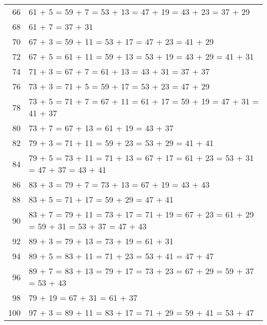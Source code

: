 \documentclass[12pt]{article}
\begin{document}
\begin{tabular}{|r|l|}
66 & 61 + 5 = 59 + 7 = 53 + 13 = 47 + 19 = 43 + 23 = 37 + 29 \\
68 & 61 + 7 = 37 + 31 \\
70 & 67 + 3 = 59 + 11 = 53 + 17 = 47 + 23 = 41 + 29 \\
72 & 67 + 5 = 61 + 11 = 59 + 13 = 53 + 19 = 43 + 29 = 41 + 31 \\
74 & 71 + 3 = 67 + 7 = 61 + 13 = 43 + 31 = 37 + 37 \\
76 & 73 + 3 = 71 + 5 = 59 + 17 = 53 + 23 = 47 + 29 \\
78 & 73 + 5 = 71 + 7 = 67 + 11 = 61 + 17 = 59 + 19 = 47 + 31 = 41 + 37 \\
80 & 73 + 7 = 67 + 13 = 61 + 19 = 43 + 37 \\
82 & 79 + 3 = 71 + 11 = 59 + 23 = 53 + 29 = 41 + 41 \\
84 & 79 + 5 = 73 + 11 = 71 + 13 = 67 + 17 = 61 + 23 = 53 + 31 = 47 + 37 = 43 + 41 \\
86 & 83 + 3 = 79 + 7 = 73 + 13 = 67 + 19 = 43 + 43 \\
88 & 83 + 5 = 71 + 17 = 59 + 29 = 47 + 41 \\
90 & 83 + 7 = 79 + 11 = 73 + 17 = 71 + 19 = 67 + 23 = 61 + 29 = 59 + 31 = 53 + 37 = 47 + 43 \\
92 & 89 + 3 = 79 + 13 = 73 + 19 = 61 + 31 \\
94 & 89 + 5 = 83 + 11 = 71 + 23 = 53 + 41 = 47 + 47 \\
96 & 89 + 7 = 83 + 13 = 79 + 17 = 73 + 23 = 67 + 29 = 59 + 37 = 53 + 43 \\
98 & 79 + 19 = 67 + 31 = 61 + 37 \\
100 & 97 + 3 = 89 + 11 = 83 + 17 = 71 + 29 = 59 + 41 = 53 + 47 \\
\end{tabular}

\end{document}
